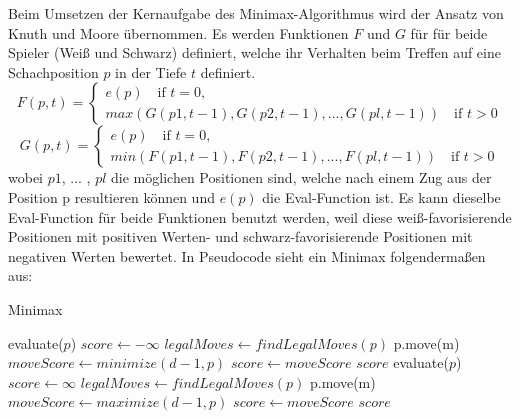 Beim Umsetzen der Kernaufgabe des Minimax-Algorithmus wird der Ansatz von Knuth und Moore übernommen.
Es werden Funktionen $F$ und $G$ für für beide Spieler (Weiß und Schwarz)  definiert, welche ihr Verhalten beim Treffen auf eine Schachposition $p$ in der Tiefe $t$ definiert.
\begin{equation*}
    F(p,t) =
    \begin{cases}
        e(p) \quad \text{if }t=0,\\
        max(G(p1, t-1), G(p2, t-1), ... , G(pl, t-1)) \quad \text{if } t > 0
    \end{cases}
\end{equation*}
\begin{equation*}
    G(p,t) =
    \begin{cases}
        e(p) \quad \text{if }t=0,\\
        min(F(p1, t-1), F(p2, t-1), ... , F(pl, t-1)) \quad \text{if } t > 0
    \end{cases}
\end{equation*}
wobei $p1$, ... , $pl$ die möglichen Positionen sind, welche nach einem Zug aus der Position p resultieren können und $e(p)$ die Eval-Function ist. Es kann dieselbe Eval-Function für beide Funktionen benutzt werden, weil diese weiß-favorisierende Positionen mit positiven Werten- und schwarz-favorisierende Positionen mit negativen Werten bewertet.
In Pseudocode sieht ein Minimax folgendermaßen aus:

\begin{algorithm}[H]
    \caption{Minimax}
    \begin{algorithmic}[1]
        \State \Return evaluate($p$)
        \Else
        \State $score \gets -\infty$
        \State $legalMoves \gets findLegalMoves(p)$
        \State p.move(m)
        \State $moveScore \gets minimize(d-1, p)$
        \State $score \gets moveScore$
        \EndIf
        \EndFor
        \EndIf
        \State \Return $score$
        \EndFunction
        \State \Return evaluate($p$)
        \Else
        \State $score \gets \infty$
        \State $legalMoves \gets findLegalMoves(p)$
        \State p.move(m)
        \State $moveScore \gets maximize(d-1, p)$
        \State $score \gets moveScore$
        \EndIf
        \EndFor
        \EndIf
        \State \Return $score$
        \EndFunction
    \end{algorithmic}
\end{algorithm}
